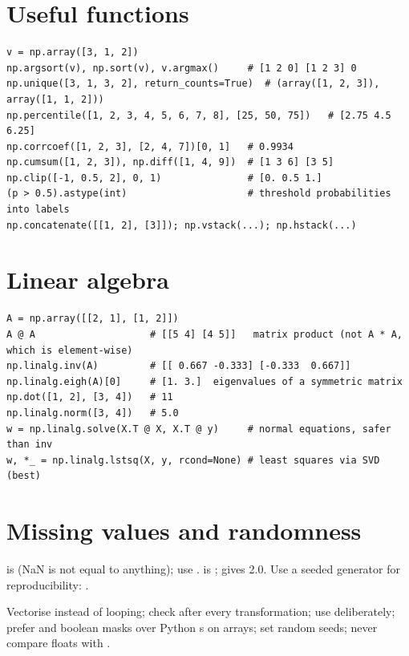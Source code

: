 \section{Useful functions}
\begin{lstlisting}
v = np.array([3, 1, 2])
np.argsort(v), np.sort(v), v.argmax()     # [1 2 0] [1 2 3] 0
np.unique([3, 1, 3, 2], return_counts=True)  # (array([1, 2, 3]), array([1, 1, 2]))
np.percentile([1, 2, 3, 4, 5, 6, 7, 8], [25, 50, 75])   # [2.75 4.5 6.25]
np.corrcoef([1, 2, 3], [2, 4, 7])[0, 1]   # 0.9934
np.cumsum([1, 2, 3]), np.diff([1, 4, 9])  # [1 3 6] [3 5]
np.clip([-1, 0.5, 2], 0, 1)               # [0. 0.5 1.]
(p > 0.5).astype(int)                     # threshold probabilities into labels
np.concatenate([[1, 2], [3]]); np.vstack(...); np.hstack(...)
\end{lstlisting}

\section{Linear algebra}
\begin{lstlisting}
A = np.array([[2, 1], [1, 2]])
A @ A                    # [[5 4] [4 5]]   matrix product (not A * A, which is element-wise)
np.linalg.inv(A)         # [[ 0.667 -0.333] [-0.333  0.667]]
np.linalg.eigh(A)[0]     # [1. 3.]  eigenvalues of a symmetric matrix
np.dot([1, 2], [3, 4])   # 11
np.linalg.norm([3, 4])   # 5.0
w = np.linalg.solve(X.T @ X, X.T @ y)     # normal equations, safer than inv
w, *_ = np.linalg.lstsq(X, y, rcond=None) # least squares via SVD (best)
\end{lstlisting}

\section{Missing values and randomness}
 is  (NaN is not equal to anything); use .  is ;  gives 2.0.
Use a seeded generator for reproducibility: .

\begin{practical}
Vectorise instead of looping; check  after every transformation; use  deliberately; prefer  and boolean masks over Python
s on arrays; set random seeds; never compare floats with \code{==}.
\end{practical}

